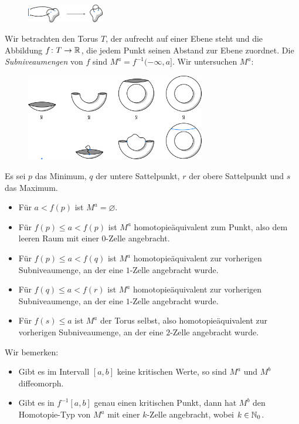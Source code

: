 \documentclass[a4paper,11pt,twoside]{scrreport}
\begin{document}
\begin{figure}[H]
    \centering
    \includegraphics[width=0.3\textwidth]{../resources/Me-Diagram1-attaching-a-1-cell.jpeg}
\end{figure}

Wir betrachten den Torus $T$, der aufrecht auf einer Ebene steht und die Abbildung 
$f \colon T \to { \mathbb R }$, die jedem Punkt seinen Abstand zur Ebene zuordnet.
Die \textit{Subniveaumengen} von $f$ sind $M^a = f^{-1} (-\infty, a]$. Wir untersuchen $M^a$:

\begin{figure}[H]
    \centering
    \includegraphics[width=0.7\textwidth]{../resources/Me-Diagram3-torus-example.jpeg}
\end{figure}

Es sei $p$ das Minimum, $q$ der untere Sattelpunkt, $r$ der obere Sattelpunkt und $s$ das Maximum.

\begin{itemize}
    \item Für $a < f(p)$ ist $M^a = \varnothing$.
    \item Für $f(p) \leq a < f(p)$ ist $M^a$ homotopieäquivalent zum Punkt,
        also dem leeren Raum mit einer $0$-Zelle angebracht.
    \item Für $f(p) \leq a < f(q)$ ist $M^a$ homotopieäquivalent zur vorherigen
        Subniveaumenge, an der eine $1$-Zelle angebracht wurde.
    \item Für $f(q) \leq a < f(r)$ ist $M^a$ homotopieäquivalent zur vorherigen
        Subniveaumenge, an der eine $1$-Zelle angebracht wurde.
    \item Für $f(s) \leq a$ ist $M^a$ der Torus selbst, also homotopieäquivalent zur 
        vorherigen Subniveaumenge, an der eine $2$-Zelle angebracht wurde.
\end{itemize}

Wir bemerken: 
\begin{itemize}
    \item Gibt es im Intervall $[a, b]$ keine kritischen Werte, so sind $M^a$ und
        $M^b$ diffeomorph.
    \item Gibt es in $f^{-1}[a, b]$ genau einen kritischen Punkt, dann hat $M^b$ 
        den Homotopie-Typ von $M^a$ mit einer $k$-Zelle angebracht, wobei 
        $k \in { \mathbb N }_0$.
\end{itemize}
\end{document}
